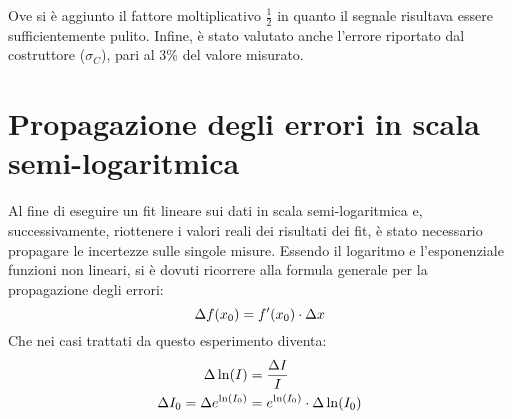 \documentclass[@SRC@/main]{subfiles}
\begin{document}
    \noindent Ove si è aggiunto il fattore moltiplicativo $\frac{1}{2}$ in quanto il segnale risultava
    essere sufficientemente pulito.\newline\newline
    \noindent Infine, è stato valutato anche l'errore riportato dal costruttore ($\sigma_C$), pari
    al 3\% del valore misurato.

    \section{Propagazione degli errori in scala semi-logaritmica}
    \label{sec:propagazione-errori-log}

    Al fine di eseguire un fit lineare sui dati in scala semi-logaritmica e, successivamente,
    riottenere i valori reali dei risultati dei fit, è stato necessario propagare le incertezze
    sulle singole misure.
    Essendo il logaritmo e l'esponenziale funzioni non lineari, si è
    dovuti ricorrere alla formula generale per la propagazione degli
    errori:
    \begin{equation*}
        \Delta f(x_0) = f'(x_0) \cdot \Delta x
        \vspace{2pt}
    \end{equation*}
    Che nei casi trattati da questo esperimento diventa:
    \begin{align*}
        \vspace{4pt}
        \Delta \ln (I) &= \frac{\Delta I}{I} \\
        \Delta I_0 = \Delta e^{\ln (I_0)} &= e^{\ln (I_0)}
        \cdot \Delta \ln (I_0)
    \end{align*}
\end{document}
